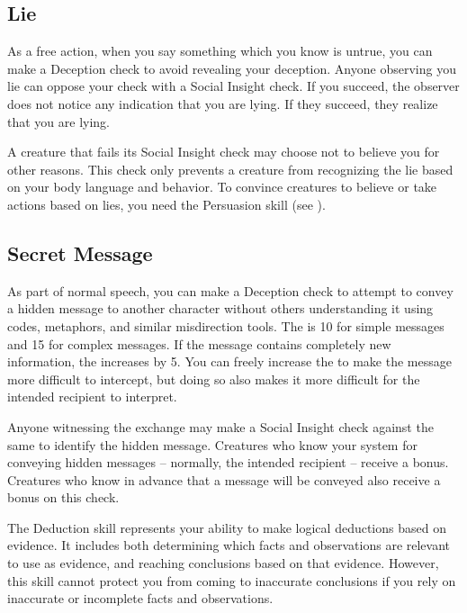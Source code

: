     \subsection{Lie}
        As a free action, when you say something which you know is untrue, you can make a Deception check to avoid revealing your deception.
        Anyone observing you lie can oppose your check with a Social Insight check.
        If you succeed, the observer does not notice any indication that you are lying.
        If they succeed, they realize that you are lying.

        A creature that fails its Social Insight check may choose not to believe you for other reasons.
        This check only prevents a creature from recognizing the lie based on your body language and behavior.
        To convince creatures to believe or take actions based on lies, you need the Persuasion skill (see ).

    \subsection{Secret Message}
        As part of normal speech, you can make a Deception check to attempt to convey a hidden message to another character without others understanding it using codes, metaphors, and similar misdirection tools. The  is 10 for simple messages and 15 for complex messages. If the message contains completely new information, the  increases by 5. You can freely increase the  to make the message more difficult to intercept, but doing so also makes it more difficult for the intended recipient to interpret.

        Anyone witnessing the exchange may make a Social Insight check against the same  to identify the hidden message.
        Creatures who know your system for conveying hidden messages -- normally, the intended recipient -- receive a  bonus.
        Creatures who know in advance that a message will be conveyed also receive a  bonus on this check.


\newpage
{}
    The Deduction skill represents your ability to make logical deductions based on evidence.
    It includes both determining which facts and observations are relevant to use as evidence, and reaching conclusions based on that evidence.
    However, this skill cannot protect you from coming to inaccurate conclusions if you rely on inaccurate or incomplete facts and observations.

